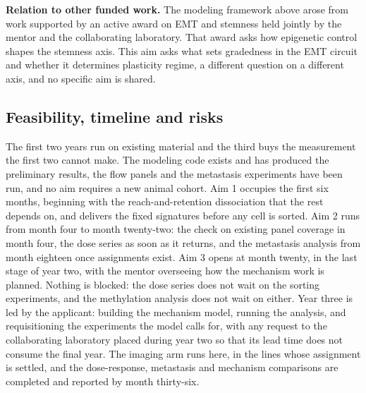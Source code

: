 \documentclass[12pt,letterpaper]{article}
\newcommand{\chg}[1]{\textcolor{chgcolor}{#1}}
\newcommand{\chg}[1]{#1}
\newcommand{\lead}[1]{\textbf{#1}}
\begin{document}
\lead{Relation to other funded work.} The modeling framework above arose from work supported by an active award on EMT and stemness held jointly by the mentor and the collaborating laboratory. That award asks how epigenetic control shapes the stemness axis. This aim asks what sets gradedness in the EMT circuit and whether it determines plasticity regime, a different question on a different axis, and no specific aim is shared.

\subsection{Feasibility, timeline and risks}

The first two years run on existing material and the third buys the measurement the first two cannot make. The modeling code exists and has produced the preliminary results, the flow panels and the metastasis experiments have been run, and no aim requires a new animal cohort. Aim 1 occupies the first six months, beginning with the reach-and-retention dissociation that the rest depends on, and delivers the fixed signatures before any cell is sorted. Aim 2 runs from month four to month \chg{twenty-two}: the check on existing panel coverage in month four, the dose series as soon as it returns, and the metastasis analysis from month eighteen once assignments exist. Aim 3 \chg{opens at month twenty, in the last stage of year two, with the mentor overseeing how the mechanism work is planned}. Nothing is blocked: the dose series does not wait on the sorting experiments, and the methylation analysis does not wait on either. \chg{Year three is led by the applicant: building the mechanism model, running the analysis, and requisitioning the experiments the model calls for, with any request to the collaborating laboratory placed during year two so that its lead time does not consume the final year. The imaging arm runs here, in the lines whose assignment is settled, and the dose-response, metastasis and mechanism comparisons are completed and reported by month thirty-six.}
\end{document}
